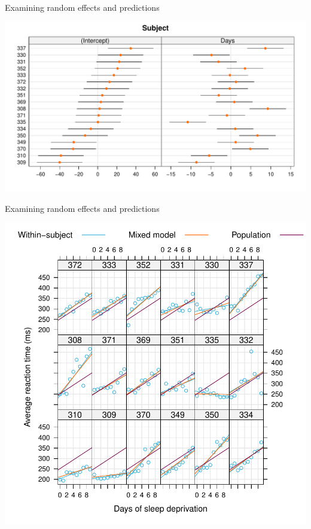 \documentclass[aspectratio=169]{beamer}
\begin{document}
\begin{frame}[fragile]{Examining random effects and predictions}
  \begin{center}
    \includegraphics[scale=.5]{../figures/sleep_caterpillar}
  \end{center}
\end{frame}

\begin{frame}{Examining random effects and predictions}
  \begin{center}
    \includegraphics[scale=.48]{../figures/sleep_shrinkfit}
  \end{center}
\end{frame}
\end{document}
